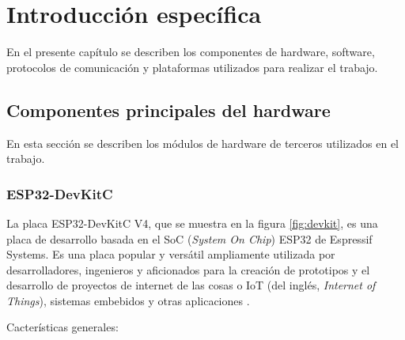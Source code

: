 \chapter{Introducción específica} %

\label{Chapter2}

En el presente capítulo se describen los componentes de hardware, software, protocolos de comunicación y plataformas utilizados para realizar el trabajo.

\section{Componentes principales del hardware}
\label{sec:hw:components}

En esta sección se describen los módulos de hardware de terceros utilizados en el trabajo.

\subsection{ESP32-DevKitC}

La placa ESP32-DevKitC V4, que se muestra en la figura \ref{fig:devkit}, es una placa de desarrollo basada en el SoC (\textit{System On Chip}) ESP32 de Espressif Systems. Es una placa popular y versátil ampliamente utilizada por desarrolladores, ingenieros y aficionados para la creación de prototipos y el desarrollo de proyectos de internet de las cosas o IoT (del inglés, \textit{Internet of Things}), sistemas embebidos y otras aplicaciones \cite{DEV:KIT}.

Cacterísticas generales:

